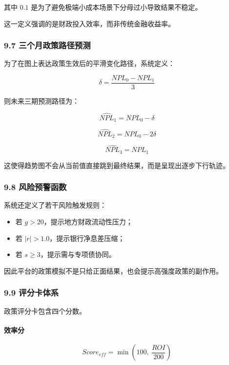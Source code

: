 \documentclass[
]{article}
\providecommand{\tightlist}{%
  \setlength{\itemsep}{0pt}\setlength{\parskip}{0pt}}
\begin{document}
其中 \(0.1\) 是为了避免极端小成本场景下分母过小导致结果不稳定。

这一定义强调的是财政投入效率，而非传统金融收益率。

\subsubsection{9.7
三个月政策路径预测}\label{ux4e09ux4e2aux6708ux653fux7b56ux8defux5f84ux9884ux6d4b}

为了在图上表达政策生效后的平滑变化路径，系统定义：

\[
\delta = \frac{NPL_0 - NPL_1}{3}
\]

则未来三期预测路径为：

\[
\hat{NPL}_1 = NPL_0 - \delta
\]

\[
\hat{NPL}_2 = NPL_0 - 2\delta
\]

\[
\hat{NPL}_3 = NPL_1
\]

这使得趋势图不会从当前值直接跳到最终结果，而是呈现出逐步下行轨迹。

\subsubsection{9.8
风险预警函数}\label{ux98ceux9669ux9884ux8b66ux51fdux6570}

系统还定义了若干风险触发规则：

\begin{itemize}
\tightlist
\item
  若 \(g > 20\)，提示地方财政流动性压力；
\item
  若 \(|r| > 1.0\)，提示银行净息差压缩；
\item
  若 \(s \ge 3\)，提示需与专项债协同。
\end{itemize}

因此平台的政策模拟不是只给正面结果，也会提示高强度政策的副作用。

\subsubsection{9.9 评分卡体系}\label{ux8bc4ux5206ux5361ux4f53ux7cfb}

政策评分卡包含四个分数。

\paragraph{效率分}\label{ux6548ux7387ux5206}

\[
Score_{eff} = \min\left(100,\ \frac{ROI}{200}\right)
\]
\end{document}
